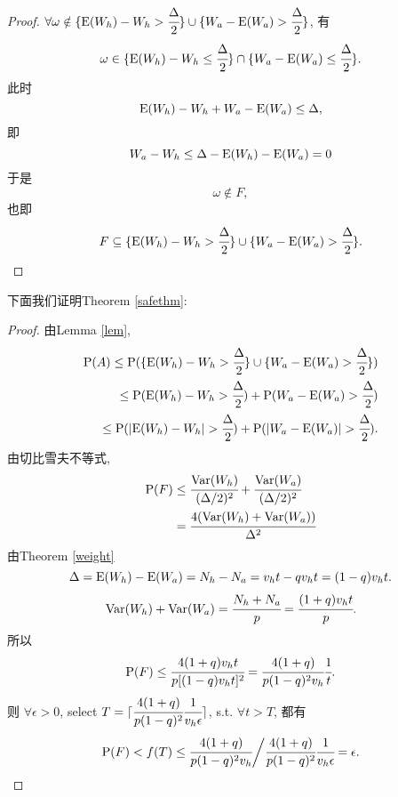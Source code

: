 \documentclass[UTF8]{ctexart}
\theoremstyle{definition}
\theoremstyle{plain}
\begin{document}
\begin{proof}
$\forall\omega\notin\{{\rm E}(W_h)-W_h>\cfrac{\Delta}{2}\} \cup \{W_a-{\rm E}(W_a)>\cfrac{\Delta}{2}\}$, 有
\[\omega\in \{{\rm E}(W_h)-W_h\le\cfrac{\Delta}{2}\} \cap \{W_a-{\rm E}(W_a)\le\cfrac{\Delta}{2}\}.\] 此时
\[{\rm E}(W_h)-W_h+W_a-{\rm E}(W_a)\le\Delta,\]即
\[W_a-W_h \le \Delta - {\rm E}(W_h)-{\rm E}(W_a)= 0 \]
于是\[\omega \notin F,\] 也即\[F \subseteq \{{\rm E}(W_h)-W_h>\cfrac{\Delta}{2}\} \cup \{W_a-{\rm E}(W_a)>\cfrac{\Delta}{2}\}.\]
\end{proof}

下面我们证明Theorem \ref{safethm}:
\begin{proof}
    由Lemma \ref{lem},
    \begin{align*}
        {\rm P}(A) \le {\rm P}(\{{\rm E}(W_h)-W_h>\cfrac{\Delta}{2}\} \cup \{W_a-{\rm E}(W_a)>\cfrac{\Delta}{2}\}) \\ \le 
    {\rm P}({\rm E}(W_h)-W_h>\cfrac{\Delta}{2})+{\rm P}(W_a-{\rm E}(W_a)>\cfrac{\Delta}{2}) \\ 
    \le {\rm P}(|{\rm E}(W_h)-W_h|>\cfrac{\Delta}{2})+{\rm P}(|W_a-{\rm E}(W_a)|>\cfrac{\Delta}{2}).
    \end{align*}
    由切比雪夫不等式, 
    \begin{align*}
        {\rm P}(F) &\le \cfrac{{\rm Var}(W_h)}{(\Delta/2)^2} + \cfrac{{\rm Var}(W_a)}{(\Delta/2)^2} \\ 
        &=  \cfrac{4({\rm Var}(W_h)+{\rm Var}(W_a))}{\Delta^2}
    \end{align*}
    由Theorem \ref{weight}
    \[\Delta = {\rm E}(W_h)-{\rm E}(W_a) = N_h - N_a = v_ht-qv_ht=(1-q)v_ht.\]
    \[{\rm Var}(W_h) + {\rm Var}(W_a) = \cfrac{N_h+N_a}{p} = \cfrac{(1+q)v_ht}{p}.\]
    所以 \[{\rm P}(F) \le \cfrac{4(1+q)v_ht}{p [(1-q)v_ht]^2} = \cfrac{4(1+q)}{p(1-q)^2v_h} \cfrac{1}{t}. \]
    则
    $\forall \epsilon>0$, select $T = \lceil \cfrac{4(1+q)}{p(1-q)^2} \cfrac{1}{v_h \epsilon} \rceil$, s.t. $\forall t>T$, 都有
    \[{\rm P}(F) < f(T) \le \cfrac{4(1+q)}{p(1-q)^2v_h}\bigg/\cfrac{4(1+q)}{p(1-q)^2} \cfrac{1}{v_h \epsilon} = \epsilon.\]
\end{proof}
\end{document}
